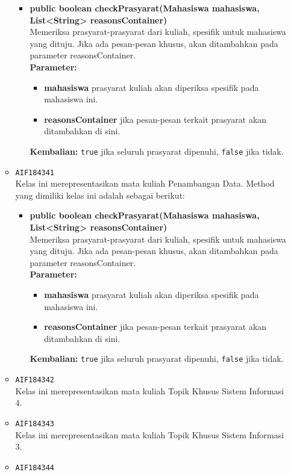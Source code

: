 \begin{enumerate}
\begin{itemize}
\begin{itemize}
\item \textbf{public boolean checkPrasyarat(Mahasiswa mahasiswa, List<String> reasonsContainer)}\\
Memeriksa prasyarat-prasyarat dari kuliah, spesifik untuk mahasiswa yang dituju. Jika ada pesan-pesan khusus, akan ditambahkan pada parameter reasonsContainer.\\
\textbf{Parameter:}
\begin{itemize}
\item \textbf{mahasiswa} prasyarat kuliah akan diperiksa spesifik pada mahasiswa ini.
\item \textbf{reasonsContainer} jika pesan-pesan terkait prasyarat akan ditambahkan di sini.
\end{itemize}
\textbf{Kembalian:} \texttt{true} jika seluruh prasyarat dipenuhi, \texttt{false} jika tidak.
\end{itemize}
\item \texttt{AIF184341} \\
Kelas ini merepresentasikan mata kuliah Penambangan Data. Method yang dimiliki kelas ini adalah sebagai berikut: 
\begin{itemize}
\item \textbf{public boolean checkPrasyarat(Mahasiswa mahasiswa, List<String> reasonsContainer)}\\
Memeriksa prasyarat-prasyarat dari kuliah, spesifik untuk mahasiswa yang dituju. Jika ada pesan-pesan khusus, akan ditambahkan pada parameter reasonsContainer.\\
\textbf{Parameter:}
\begin{itemize}
\item \textbf{mahasiswa} prasyarat kuliah akan diperiksa spesifik pada mahasiswa ini.
\item \textbf{reasonsContainer} jika pesan-pesan terkait prasyarat akan ditambahkan di sini.
\end{itemize}
\textbf{Kembalian:} \texttt{true} jika seluruh prasyarat dipenuhi, \texttt{false} jika tidak.
\end{itemize}
\item \texttt{AIF184342} \\
Kelas ini merepresentasikan mata kuliah Topik Khusus Sistem Informasi 4.
\item \texttt{AIF184343} \\
Kelas ini merepresentasikan mata kuliah Topik Khusus Sistem Informasi 3.
\item \texttt{AIF184344} \\

\end{itemize}
\end{enumerate}
